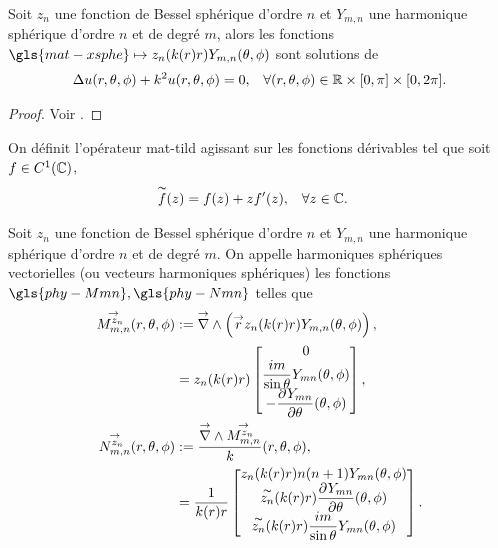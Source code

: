     \begin{prop}
        Soit \(z_n\) une fonction de Bessel sphérique d'ordre \(n\) et \(Y_{m,n}\) une harmonique sphérique d'ordre \(n\) et de degré \(m\), alors les fonctions \(\gls{mat-xsphe} \mapsto z_n(k(r)r)Y_{m,n}(\tp)\) sont solutions de 
        \begin{align*}
            \Delta u(r,\theta,\phi) + k^2u(r,\theta,\phi) = 0, && \forall (r,\theta,\phi) \in \mathbb R\times[0,\pi]\times[0,2\pi].
        \end{align*}
    \end{prop}
    \begin{proof}
        Voir \cite[section.~2.6.1]{nedelec_acoustic_2001}.
    \end{proof}

    \begin{defn}
        On définit l’opérateur \gls{mat-tild} agissant sur les fonctions dérivables tel que soit \(f \in C^1(\mathbb C)\),
        \begin{align*}
        &\overset{\thicksim}{f}(z) = f(z) + zf'(z), && \forall z \in \mathbb C.
        \end{align*}
    \end{defn}

    \begin{defn}
        \label{def:sphere:harmoniques_spheriques_vect}
        Soit \(z_n\) une fonction de Bessel sphérique d'ordre \(n\) et \(Y_{m,n}\) une harmonique sphérique d'ordre \(n\) et de degré \(m\).
        On appelle harmoniques sphériques vectorielles (ou vecteurs harmoniques sphériques) les fonctions \(\gls{phy-Mmn},\gls{phy-Nmn}\) telles que
        \begin{align}
            \label{eq:defMmn}
            \Mmn[z_n](\rtp) &:= \vrot \left( \vect{r} z_n(k(r)r) Y_{m,n}(\tp) \right),
            \\
            \notag&= z_n(k(r)r)
            \begin{bmatrix}
                0
                \\
                \frac{im}{\sin\theta}Y_{mn}(\tp)
                \\
                - \ddr{\theta}{Y_{mn}}(\tp)
            \end{bmatrix},
            \\
            \label{eq:defNnn}
            \Nmn[z_n](\rtp) &:= \frac{\vrot \Mmn[z_n]}{k}(\rtp),
            \\
            \notag&= \frac{1}{k(r)r}\begin{bmatrix}
                z_n(k(r)r)n(n+1)Y_{mn}(\tp)
                \\
                \tilde{z_n}(k(r)r)\ddr{\theta}{Y_{mn}}(\tp)
                \\
                \tilde{z_n}(k(r)r)\frac{im}{\sin\theta}Y_{mn}(\tp)
            \end{bmatrix}.
        \end{align}
    \end{defn}

